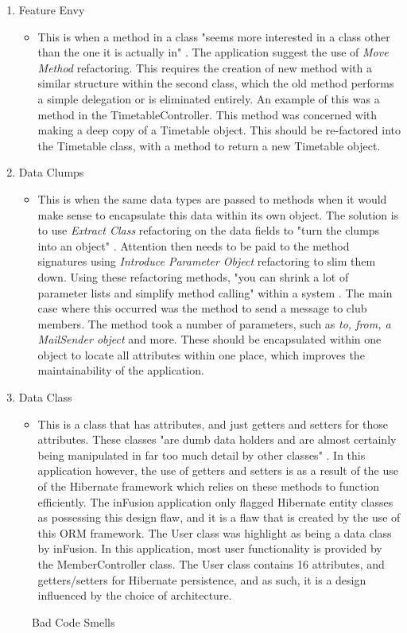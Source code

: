 \begin{enumerate}
\begin{itemize}
\end{itemize}
\item Feature Envy
\begin{itemize}
\item This is when a method in a class "seems more interested in a class other than the one it is actually in" \parencite{beck1999bad}. The application suggest the use of \textit{Move Method} refactoring. This requires the creation of new method with a similar structure within the second class, which the old method performs a simple delegation or is eliminated entirely. An example of this was a method in the TimetableController. This method was concerned with making a deep copy of a Timetable object. This should be re-factored into the Timetable class, with a method to return a new Timetable object. 
\end{itemize}
\item Data Clumps
\begin{itemize}
\item This is when the same data types are passed to methods when it would make sense to encapsulate this data within its own object. The solution is to use \textit{Extract Class} refactoring on the data fields to "turn the clumps into an object" \parencite{beck1999bad}. Attention then needs to be paid to the method signatures using \textit{Introduce Parameter Object} refactoring to slim them down. Using these refactoring methods, "you can shrink a lot of parameter lists and simplify method calling" within a system \parencite{beck1999bad}. The main case where this occurred was the method to send a message to club members. The method took a number of parameters, such as \textit{to, from, a MailSender object} and more. These should be encapsulated within one object to locate all attributes within one place, which improves the maintainability of the application.
\end{itemize}
\item Data Class
\begin{itemize}
\item This is a class that has attributes, and just getters and setters for those attributes. These classes "are dumb data holders and are almost certainly being manipulated in far too much detail by other classes" \parencite{beck1999bad}. In this application however, the use of getters and setters is as a result of the use of the Hibernate framework which relies on these methods to function efficiently. The inFusion application only flagged Hibernate entity classes as possessing this design flaw, and it is a flaw that is created by the use of this ORM framework. The User class was highlight as being a data class by inFusion. In this application, most user functionality is provided by the MemberController class. The User class contains 16 attributes, and getters/setters for Hibernate persistence, and as such, it is a design influenced by the choice of architecture.
\end{itemize}
\end{enumerate}
\begin{figure}[h]
\caption{Bad Code Smells}
\label{fig:badcodesmells}
\end{figure}

